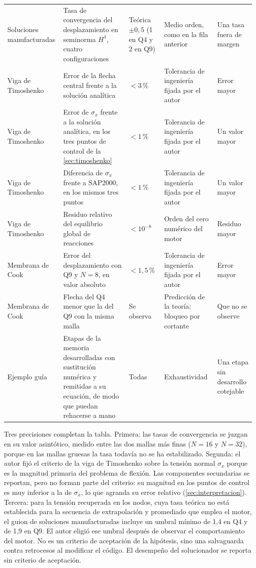{\begin{longtable}{@{}>{\raggedright\arraybackslash}p{2.3cm}>{\raggedright\arraybackslash}p{3.6cm}>{\raggedright\arraybackslash}p{2.6cm}>{\raggedright\arraybackslash}p{3.0cm}>{\raggedright\arraybackslash}p{2.3cm}@{}}
Soluciones manufacturadas & Tasa de convergencia del desplazamiento en seminorma $H^1$, cuatro configuraciones & Teórica $\pm 0{,}5$ (1 en Q4 y 2 en Q9) & Medio orden, como en la fila anterior & Una tasa fuera de margen \\
Viga de Timoshenko & Error de la flecha central frente a la solución analítica & $< 3\,\%$ & Tolerancia de ingeniería fijada por el autor & Error mayor \\
Viga de Timoshenko & Error de $\sigma_x$ frente a la solución analítica, en los tres puntos de control de la \autoref{sec:timoshenko} & $< 1\,\%$ & Tolerancia de ingeniería fijada por el autor & Un valor mayor \\
Viga de Timoshenko & Diferencia de $\sigma_x$ frente a SAP2000, en los mismos tres puntos & $< 1\,\%$ & Tolerancia de ingeniería fijada por el autor & Un valor mayor \\
Viga de Timoshenko & Residuo relativo del equilibrio global de reacciones & $< 10^{-8}$ & Orden del cero numérico del motor & Residuo mayor \\
Membrana de Cook & Error del desplazamiento con Q9 y $N=8$, en valor absoluto & $< 1{,}5\,\%$ & Tolerancia de ingeniería fijada por el autor & Error mayor \\
Membrana de Cook & Flecha del Q4 menor que la del Q9 con la misma malla & Se observa & Predicción de la teoría: bloqueo por cortante & Que no se observe \\
Ejemplo guía & Etapas de la memoria desarrolladas con sustitución numérica y remitidas a su ecuación, de modo que puedan rehacerse a mano & Todas & Exhaustividad & Una etapa sin desarrollo cotejable \\
\end{longtable}}

Tres precisiones completan la tabla. Primera: las tasas de convergencia se juzgan en su valor asintótico, medido entre las dos mallas más finas ($N=16$ y $N=32$), porque en las mallas gruesas la tasa todavía no se ha estabilizado. Segunda: el autor fijó el criterio de la viga de Timoshenko sobre la tensión normal $\sigma_x$ porque es la magnitud primaria del problema de flexión. Las componentes secundarias se reportan, pero no forman parte del criterio: su magnitud en los puntos de control es muy inferior a la de $\sigma_x$, lo que agranda su error relativo (\autoref{sec:interpretacion}). Tercera: para la tensión recuperada en los nodos, cuya tasa teórica no está establecida para la secuencia de extrapolación y promediado que emplea el motor, el guion de soluciones manufacturadas incluye un umbral mínimo de 1,4 en Q4 y de 1,9 en Q9. El autor eligió ese umbral después de observar el comportamiento del motor. No es un criterio de aceptación de la hipótesis, sino una salvaguarda contra retrocesos al modificar el código. El desempeño del solucionador se reporta sin criterio de aceptación.

